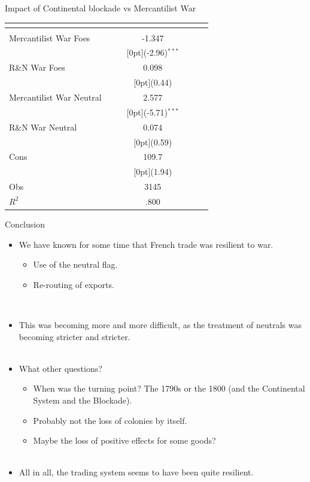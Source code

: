 \documentclass[11pt]{beamer}
\begin{document}
\begin{frame}{Impact of Continental blockade vs Mercantilist War}
\begin{tabular*}{\textwidth}{@{\extracolsep{\fill}}lcccccc}						
 &	\multicolumn{1}{c}{} &	\multicolumn{1}{c}{} & \multicolumn{1}{c}{} & \\
\hline					
\hline \\					
Mercantilist War Foes & & & -1.347 &	&  &\\
&	& &	\raisebox{.7ex}[0pt]{\scriptsize (-2.96)$^{***}$} &	& &\\
R\&N War Foes &	& &0.098 &	&  &\\
 &	& &	\raisebox{.7ex}[0pt]{\scriptsize (0.44)} &	& \\
Mercantilist War Neutral &	& &2.577 &	&  \\
 &	& &	\raisebox{.7ex}[0pt]{\scriptsize (-5.71)$^{***}$} &	& \\
R\&N War Neutral	 &	& & 0.074 &	& \\
 &	& &	\raisebox{.7ex}[0pt]{\scriptsize (0.59)} &	& \\
Cons &	& &	109.7  &	 & \\
 &	& &	\raisebox{.7ex}[0pt]{\scriptsize (1.94)} &	& \\
\hline 
Obs  &	& &	3145  & & \\
$ R^2$  &	& &	.800  & & \\

\hline\hline						
\end{tabular*}%
\end{frame}




\begin{frame}{Conclusion}
\begin{itemize}
\item{We have known for some time that French trade was resilient to war.}
\begin{itemize}
\item{Use of the neutral flag.}
\item{Re-routing of exports.}
\end{itemize}~\\
\item{This was becoming more and more difficult, as the treatment of neutrals was becoming stricter and stricter.}\\~\\
\item{What other questions?}
\begin{itemize}
\item{When was the turning point? The 1790s or the 1800 (and the Continental System and the Blockade).}
\item{Probably not the loss of colonies by itself.}
\item{Maybe the loss of positive effects for some goods?}\\~\\
\end{itemize}
\item{All in all, the trading system seems to have been quite resilient.}

\end{itemize}
\end{frame}
\end{document}
